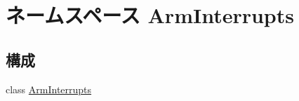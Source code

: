 \hypertarget{namespaceArmInterrupts}{
\section{ネームスペース ArmInterrupts}
\label{namespaceArmInterrupts}
}
\subsection*{構成}
\begin{DoxyCompactItemize}
\item 
class \hyperlink{classArmInterrupts_1_1ArmInterrupts}{ArmInterrupts}
\end{DoxyCompactItemize}
